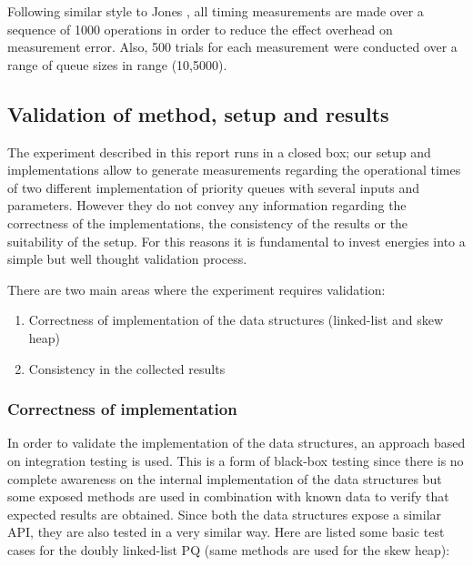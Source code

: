 \documentclass{article}
\begin{document}
Following similar style to Jones \cite{Jones}, all timing measurements are made over a sequence of 1000 operations in order to reduce the effect overhead on measurement error. Also, 500 trials for each measurement were conducted over a range of queue sizes in range (10,5000).

\subsection{Validation of method, setup and results}
The experiment described in this report runs in a closed box; our setup and implementations allow to generate measurements regarding the operational times of two different implementation of priority queues with several inputs and parameters. However they do not convey any information regarding the correctness of the implementations, the consistency of the results or the suitability of the setup. For this reasons it is fundamental to invest energies into a simple but well thought validation process.

There are two main areas where the experiment requires validation:

\begin{enumerate}
    \item Correctness of implementation of the data structures (linked-list and skew heap)
    \item Consistency in the collected results
\end{enumerate}

\subsubsection{Correctness of implementation}
In order to validate the implementation of the data structures, an approach based on integration testing is used. This is a form of black-box testing since there is no complete awareness on the internal implementation of the data structures but some exposed methods are used in combination with known data to verify that expected results are obtained. Since both the data structures expose a similar API, they are also tested in a very similar way. Here are listed some basic test cases for the doubly linked-list PQ (same methods are used for the skew heap):
\end{document}
